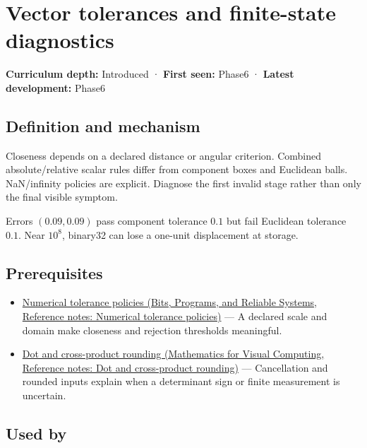\hypertarget{appendix-b5b83329215b}{}\label{referencestart:appendix-b5b83329215b}
\section{Vector tolerances and finite-state diagnostics}\label{appendix-b5b83329215b-vector-tolerances-and-finite-state-diagnostics}

\textbf{Curriculum depth:} Introduced · \textbf{First seen:} Phase6 · \textbf{Latest development:} Phase6

\subsection{Definition and mechanism}\label{appendix-b5b83329215b-definition-and-mechanism}

Closeness depends on a declared distance or angular criterion. Combined absolute/relative scalar rules differ from component boxes and Euclidean balls. NaN/infinity policies are explicit. Diagnose the first invalid stage rather than only the final visible symptom.

Errors \((0.09,0.09)\) pass component tolerance \(0.1\) but fail Euclidean tolerance \(0.1\). Near \(10^8\), binary32 can lose a one-unit displacement at storage.

\subsection{Prerequisites}\label{appendix-b5b83329215b-prerequisites}

\begin{itemize}
\tightlist
\item
  \href{../01-Bits-Programs-and-Reliable-Systems/main.pdf\#nameddest=appendix-0ec599f8ba27}{Numerical tolerance policies (Bits, Programs, and Reliable Systems, Reference notes: Numerical tolerance policies)} --- A declared scale and domain make closeness and rejection thresholds meaningful.
\item
  \href{../02-Mathematics-for-Visual-Computing/main.pdf\#nameddest=appendix-5aef4f13483a}{Dot and cross-product rounding (Mathematics for Visual Computing, Reference notes: Dot and cross-product rounding)} --- Cancellation and rounded inputs explain when a determinant sign or finite measurement is uncertain.
\end{itemize}

\subsection{Used by}\label{appendix-b5b83329215b-used-by}


